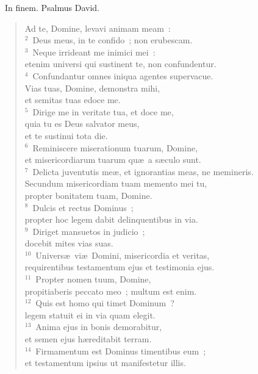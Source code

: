 ~\lettrine[lines=10,image=true,loversize=0.05,lraise=-0.03]{I}{}n finem. Psalmus David. \begin{flushleft}\begin{verse}\vspace{6pt}Ad te, Domine, levavi animam meam~:\\
${}^{2}$~Deus meus, in te confido~; non erubescam.\\
${}^{3}$~Neque irrideant me inimici mei~:\\ etenim universi qui sustinent te, non confundentur.\\
${}^{4}$~Confundantur omnes iniqua agentes supervacue.\\ Vias tuas, Domine, demonstra mihi,\\ et semitas tuas edoce me.\\
${}^{5}$~Dirige me in veritate tua, et doce me,\\ quia tu es Deus salvator meus,\\ et te sustinui tota die.\\
${}^{6}$~Reminiscere miserationum tuarum, Domine,\\ et misericordiarum tuarum qu\ae\ a s\ae culo sunt.\\
${}^{7}$~Delicta juventutis me\ae , et ignorantias meas, ne memineris.\\ Secundum misericordiam tuam memento mei tu,\\ propter bonitatem tuam, Domine.\\
${}^{8}$~Dulcis et rectus Dominus~;\\ propter hoc legem dabit delinquentibus in via.\\
${}^{9}$~Diriget mansuetos in judicio~;\\ docebit mites vias suas.\\
${}^{10}$~Univers\ae\ vi\ae\ Domini, misericordia et veritas,\\ requirentibus testamentum ejus et testimonia ejus.\\
${}^{11}$~Propter nomen tuum, Domine,\\ propitiaberis peccato meo~; multum est enim.\\
${}^{12}$~Quis est homo qui timet Dominum~?\\ legem statuit ei in via quam elegit.\\
${}^{13}$~Anima ejus in bonis demorabitur,\\ et semen ejus h\ae reditabit terram.\\
${}^{14}$~Firmamentum est Dominus timentibus eum~;\\ et testamentum ipsius ut manifestetur illis.\\

\end{verse}
\end{flushleft}
